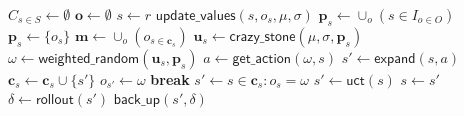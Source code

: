 \begin{algorithm}
	\caption{$\mathsf{OL-MCTS}(O, r, t, d, v, \mu, \sigma)$}
	\label{alg:olmcts}
	\begin{algorithmic}[1]
		\State $C_{s \in S} \gets \emptyset$
		\State $\mathbf{o} \gets \emptyset$
		 \label{alg:olmcts:mainloop}
			\State $s \gets r$
			 \label{alg:olmcts:innerloop}
				 \label{alg:olmcts:sp}
					\State $\mathsf{update\_values}(s, o_s, \mu, \sigma)$
						 \label{alg:olmcts:update}
					\State $\mathbf{p}_s \gets \cup_o (s \in I_{o \in O})$
				\Else
					\State $\mathbf{p}_s \gets \{o_s\}$
				\EndIf \label{alg:olmcts:scs}
				\State $\mathbf{m} \gets \cup_o (o_{s \in \mathbf{c}_s})$
				  
					\label{alg:olmcts:ns}
					\State $\mathbf{u}_s \gets \mathsf{crazy\_stone}(\mu, \sigma, \mathbf{p}_s)$
					\State $\omega \gets \mathsf{weighted\_random}(\mathbf{u}_s, \mathbf{p}_s)$
					 
						\State $a \gets \mathsf{get\_action}(\omega, s)$ \label{alg:olmcts:scs}
						\State $s' \gets \mathsf{expand}(s, a)$ 
						\State $\mathbf{c}_s \gets \mathbf{c}_s \cup \{s'\}$
						\State $o_{s'} \gets \omega$
						\State \textbf{break} \label{alg:olmcts:ecs}
					\Else
						\State $s' \gets s \in \mathbf{c}_s : o_s = \omega$ \label{alg:olmcts:s}
					\EndIf
				\Else {}
					\State $s' \gets \mathsf{uct}(s)$ \label{alg:olmcts:uct}
				\EndIf \label{alg:olmcts:ecs}
				\State $s \gets s'$ \label{alg:olmcts:ss}
			\EndWhile
			\State $\delta \gets \mathsf{rollout}(s')$ \label{alg:olmcts:rollout}
			\State $\mathsf{back\_up}(s', \delta)$ \label{alg:olmcts:backup}
		\EndWhile
	\end{algorithmic}
\end{algorithm}
